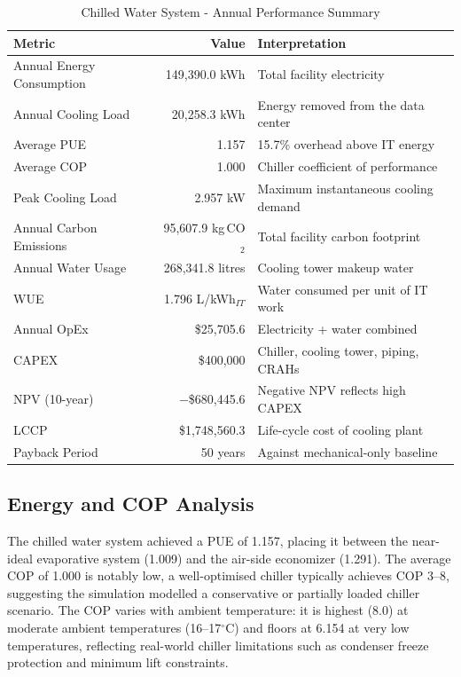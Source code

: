 ﻿\documentclass[12pt,a4paper]{report}
\newcommand{\degC}{$^{\circ}$C}
\begin{document}
\begin{table}[H]
\centering
\caption{Chilled Water System - Annual Performance Summary}
\label{tab:chw_annual}
\renewcommand{\arraystretch}{1.4}
\begin{tabular}{lrp{5.8cm}}
\toprule
\textbf{Metric} & \textbf{Value} & \textbf{Interpretation} \\
\midrule
Annual Energy Consumption & 149{,}390.0 kWh & Total facility electricity \\
Annual Cooling Load & 20{,}258.3 kWh & Energy removed from the data center \\
Average PUE & 1.157 & 15.7\% overhead above IT energy \\
Average COP & 1.000 & Chiller coefficient of performance \\
Peak Cooling Load & 2.957 kW & Maximum instantaneous cooling demand \\
Annual Carbon Emissions & 95{,}607.9 kg\,CO$_2$ & Total facility carbon footprint \\
Annual Water Usage & 268{,}341.8 litres & Cooling tower makeup water \\
WUE & 1.796 L/kWh$_{IT}$ & Water consumed per unit of IT work \\
Annual OpEx & \$25{,}705.6 & Electricity + water combined \\
CAPEX & \$400{,}000 & Chiller, cooling tower, piping, CRAHs \\
NPV (10-year) & $-$\$680{,}445.6 & Negative NPV reflects high CAPEX \\
LCCP & \$1{,}748{,}560.3 & Life-cycle cost of cooling plant \\
Payback Period & 50 years & Against mechanical-only baseline \\
\bottomrule
\end{tabular}
\end{table}

\subsection{Energy and COP Analysis}

The chilled water system achieved a PUE of 1.157, placing it between the near-ideal
evaporative system (1.009) and the air-side economizer (1.291). The average COP of 1.000
is notably low, a well-optimised chiller typically achieves COP 3--8, suggesting
the simulation modelled a conservative or partially loaded chiller scenario. The COP
varies with ambient temperature: it is highest (8.0) at moderate ambient temperatures
(16--17\degC) and floors at 6.154 at very low temperatures, reflecting real-world chiller
limitations such as condenser freeze protection and minimum lift constraints.
\end{document}
